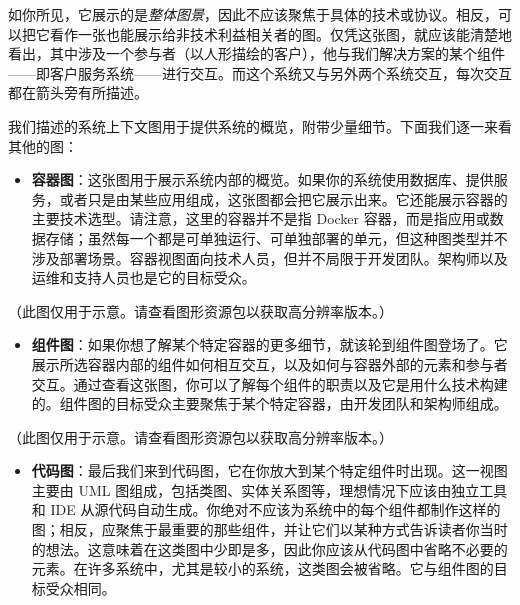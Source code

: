 
\label{idx:206}
\label{idx:207}
如你所见，它展示的是\emph{整体图景}，因此不应该聚焦于具体的技术或协议。相反，可以把它看作一张也能展示给非技术利益相关者的图。仅凭这张图，就应该能清楚地看出，其中涉及一个参与者（以人形描绘的客户），他与我们解决方案的某个组件——即客户服务系统——进行交互。而这个系统又与另外两个系统交互，每次交互都在箭头旁有所描述。

我们描述的系统上下文图用于提供系统的概览，附带少量细节。下面我们逐一来看其他的图：

\begin{itemize}
\label{idx:208}
\label{idx:209}
\item \textbf{容器图}：这张图用于展示系统内部的概览。如果你的系统使用数据库、提供服务，或者只是由某些应用组成，这张图都会把它展示出来。它还能展示容器的主要技术选型。请注意，这里的容器并不是指 Docker 容器，而是指应用或数据存储；虽然每一个都是可单独运行、可单独部署的单元，但这种图类型并不涉及部署场景。容器视图面向技术人员，但并不局限于开发团队。架构师以及运维和支持人员也是它的目标受众。
\end{itemize}


（此图仅用于示意。请查看图形资源包以获取高分辨率版本。）

\begin{itemize}
\label{idx:210}
\label{idx:211}
\label{idx:212}
\label{idx:213}
\item \textbf{组件图}：如果你想了解某个特定容器的更多细节，就该轮到组件图登场了。它展示所选容器内部的组件如何相互交互，以及如何与容器外部的元素和参与者交互。通过查看这张图，你可以了解每个组件的职责以及它是用什么技术构建的。组件图的目标受众主要聚焦于某个特定容器，由开发团队和架构师组成。
\end{itemize}


（此图仅用于示意。请查看图形资源包以获取高分辨率版本。）

\begin{itemize}
\label{idx:214}
\label{idx:215}
\item \textbf{代码图}：最后我们来到代码图，它在你放大到某个特定组件时出现。这一视图主要由 UML 图组成，包括类图、实体关系图等，理想情况下应该由独立工具和 IDE 从源代码自动生成。你绝对不应该为系统中的每个组件都制作这样的图；相反，应聚焦于最重要的那些组件，并让它们以某种方式告诉读者你当时的想法。这意味着在这类图中少即是多，因此你应该从代码图中省略不必要的元素。在许多系统中，尤其是较小的系统，这类图会被省略。它与组件图的目标受众相同。
\end{itemize}

